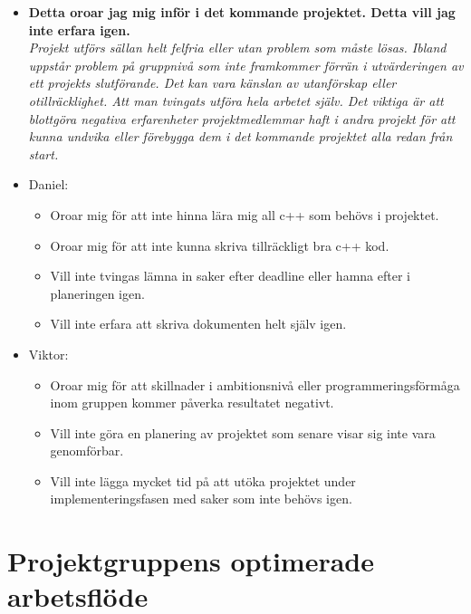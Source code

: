 \documentclass{mall}
\begin{document}
\begin{itemize}
  \newpage

\item \textbf{Detta oroar jag mig inför i det kommande projektet. Detta vill jag inte erfara igen.}
  \\\emph{ Projekt utförs sällan helt felfria eller utan problem som måste lösas. Ibland uppstår problem på gruppnivå som inte framkommer förrän i utvärderingen av ett projekts slutförande. Det kan vara känslan av utanförskap eller otillräcklighet. Att man tvingats utföra hela arbetet själv. Det viktiga är att blottgöra negativa erfarenheter projektmedlemmar haft i andra projekt för att kunna undvika eller förebygga dem i det kommande projektet alla redan från start. }

\item Daniel:
  \begin{itemize}
  \item Oroar mig för att inte hinna lära mig all c++ som behövs i projektet.
  \item Oroar mig för att inte kunna skriva tillräckligt bra c++ kod.
  \item Vill inte tvingas lämna in saker efter deadline eller hamna efter i planeringen igen.
  \item Vill inte erfara att skriva dokumenten helt själv igen.
  \end{itemize}


\item Viktor:
  \begin{itemize}
  \item Oroar mig för att skillnader i ambitionsnivå eller programmeringsförmåga inom gruppen kommer påverka resultatet negativt.
  \item Vill inte göra en planering av projektet som senare visar sig inte vara genomförbar.
  \item Vill inte lägga mycket tid på att utöka projektet under implementeringsfasen med saker som inte behövs igen.
  \end{itemize}
  
\end{itemize}

\section{Projektgruppens optimerade arbetsflöde}
\end{document}
